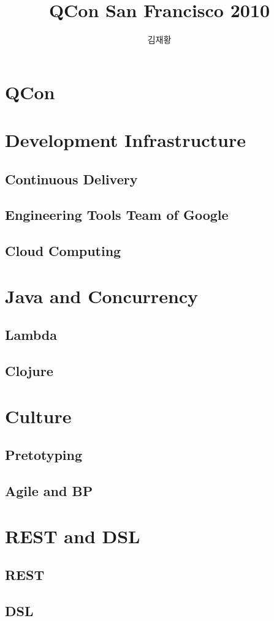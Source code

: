 \documentclass[10pt,unicode,serif,compress,slidetop]{beamer}
\title{QCon San Francisco 2010}
\author{김재황}
\institute{소프트웨어 센터}
\begin{document}
\begin{frame}[plain]
    \titlepage
\end{frame}

\section{QCon}


\section{Development Infrastructure}
\subsection{Continuous Delivery}

\subsection{Engineering Tools Team of Google}

\subsection{Cloud Computing}


\section{Java and Concurrency}

\subsection{Lambda}


\subsection{Clojure}



\section{Culture}
\subsection{Pretotyping}

\subsection{Agile and BP}


\section{REST and DSL}
\subsection{REST}

\subsection{DSL}



% 
\end{document}
